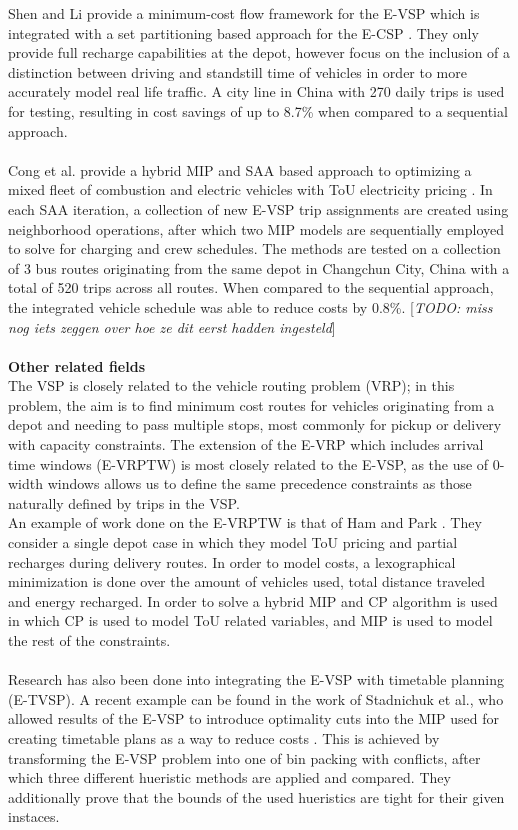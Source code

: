 \documentclass[]{article}
\newcommand{\todo}[1]{{\color{red}[\textit{TODO: #1}]}}
\begin{document}
Shen and Li provide a minimum-cost flow framework for the E-VSP which is
integrated with a set partitioning based approach for the E-CSP
\cite{Shen2023}. They only provide full recharge capabilities at the depot,
however focus on the inclusion of a distinction between driving and standstill
time of vehicles in order to more accurately model real life traffic. A city
line in China with 270 daily trips is used for testing, resulting in cost
savings of up to 8.7\% when compared to a sequential approach. \\\\

Cong et al. provide a hybrid MIP and SAA based approach to optimizing a mixed
fleet of combustion and electric vehicles with ToU electricity pricing
\cite{Cong2024}. In each SAA iteration, a collection of new E-VSP trip
assignments are created using neighborhood operations, after which two MIP
models are sequentially employed to solve for charging and crew schedules. The
methods are tested on a collection of 3 bus routes originating from the same
depot in Changchun City, China with a total of 520 trips across all routes.
When compared to the sequential approach, the integrated vehicle schedule was
able to reduce costs by 0.8\%. \todo{miss nog iets zeggen over hoe ze dit eerst
  hadden ingesteld} \\\\

\noindent \textbf{Other related fields}\\
The VSP is closely related to the vehicle routing problem (VRP); in this problem, the aim is to find minimum cost routes for vehicles originating from a depot and needing to pass multiple stops, most commonly for pickup or delivery with capacity constraints. The extension of the E-VRP which includes arrival time windows (E-VRPTW) is most closely related to the E-VSP, as the use of 0-width windows allows us to define the same precedence constraints as those naturally defined by trips in the VSP. \\
An example of work done on the E-VRPTW is that of Ham and Park \cite{Ham2021}. They consider a single depot case in which they model ToU pricing and partial recharges during delivery routes. In order to model costs, a lexographical minimization is done over the amount of vehicles used, total distance traveled and energy recharged. In order to solve a hybrid MIP and CP algorithm is used in which CP is used to model ToU related variables, and MIP is used to model the rest of the constraints. \\\\
Research has also been done into integrating the E-VSP with timetable planning (E-TVSP). A recent example can be found in the work of Stadnichuk et al., who allowed results of the E-VSP to introduce optimality cuts into the MIP used for creating timetable plans as a way to reduce costs \cite{Stadnichuk2024}. This is achieved by transforming the E-VSP problem into one of bin packing with conflicts, after which three different hueristic methods are applied and compared. They additionally prove that the bounds of the used hueristics are tight for their given instaces. \\\\
\end{document}
